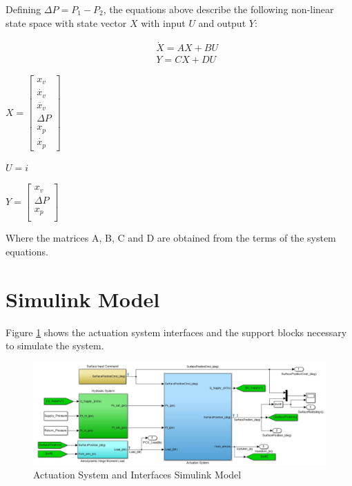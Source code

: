 Defining $\Delta P = P_1 - P_2$, the equations above describe the following non-linear state space with state vector $X$ with input $U$ and output $Y$:

\begin{eqnarray}
&& \dot{X}= A X + B U \\
&& Y = C X + D U
\end{eqnarray}

\begin{center}
	$X = \begin{bmatrix}
	x_v \\
	\dot{x_v} \\
	\ddot{x_v}\\
	\Delta P\\
	x_p\\
	\dot{x_p}
	\end{bmatrix}
	$
\end{center}

\begin{center}
	$U = i$\\
\end{center}

\begin{center}
	$Y =\begin{bmatrix}
	x_v \\
	\Delta P\\
	x_p\\
	\end{bmatrix}$
\end{center}

Where the matrices A, B, C and D are obtained from the terms of the system equations.

\section{Simulink Model}

Figure \ref{fig:3_SimulinkModel} shows the actuation system interfaces and the support blocks necessary to simulate the system.

\begin{figure}[H]
	\centering
	\centerline{\includegraphics[width=1.1\textwidth]{Figuras/3.ActuationSystemModel/3-Model.jpg}}
	\caption{Actuation System and Interfaces Simulink Model}
	\label{fig:3_SimulinkModel}
\end{figure}

